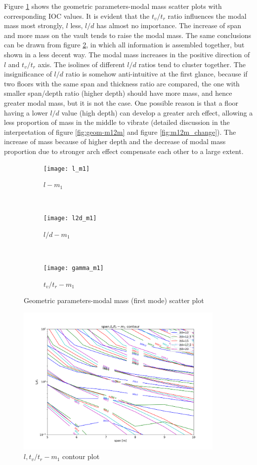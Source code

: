 Figure \ref{fig:geom-m1} shows the geometric parameters-modal mass scatter plots with corresponding IOC values. It is evident that the $t_v/t_r$ ratio influences the modal mass most strongly, $l$ less, $l/d$ has almost no importance. The increase of span and more mass on the vault tends to raise the modal mass. The same conclusions can be drawn from figure \ref{fig:l,t-m plot}, in which all information is assembled together, but shown in a less decent way. The modal mass increases in the positive direction of $l$ and $t_v/t_r$ axis. The isolines of different $l/d$ ratios tend to cluster together. The insignificance of $l/d$ ratio is somehow anti-intuitive at the first glance, because if two floors with the same span and thickness ratio are compared, the one with smaller span/depth ratio (higher depth) should have more mass, and hence greater modal mass, but it is not the case. One possible reason is that a floor having a lower $l/d$ value (high depth) can develop a greater arch effect, allowing a less proportion of mass in the middle to vibrate (detailed discussion in the interpretation of figure \ref{fig:geom-m12m} and figure \ref{fig:m12m_change}). The increase of mass because of higher depth and the decrease of modal mass proportion due to stronger arch effect compensate each other to a large extent. 
\begin{figure}[H]
\begin{subfigure}[b]{.32\textwidth}
  \centering
  \texttt{[image: l\_m1]}
  \caption{$l-m_1$}
\end{subfigure}
~
\begin{subfigure}[b]{.32\textwidth}
  \centering
  \texttt{[image: l2d\_m1]}
  \caption{$l/d-m_1$}
\end{subfigure}
~
\begin{subfigure}[b]{.32\textwidth}
  \centering
  \texttt{[image: gamma\_m1]}
  \caption{$t_v/t_r-m_1$}
\end{subfigure}

\caption{Geometric parameters-modal mass (first mode) scatter plot}
\label{fig:geom-m1}
\end{figure}

\begin{figure}[H]
\centering
\includegraphics[width=0.9\textwidth]{images/l,gamma-m1.png}
\caption{$l, t_v/t_r - m_1$ contour plot}
\label{fig:l,t-m plot}
\end{figure}

